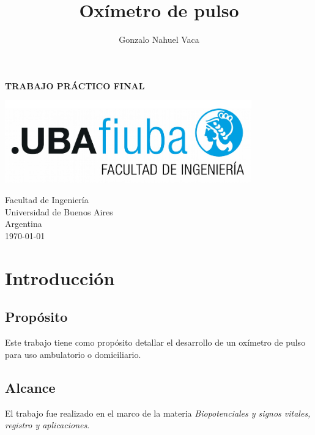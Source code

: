 \documentclass[
    11pt,
    spanish,
	a4paper
]{article}
\title{Oxímetro de pulso}
\author{Gonzalo Nahuel Vaca}
\def\doctype{TRABAJO PRÁCTICO FINAL}
\begin{document}
\makeatletter
\begin{titlepage}
	\begin{center}
		\vspace*{1cm}
		
		\Huge
		\textbf{\doctype}
		
		\vspace{0.5cm}
		\LARGE
		\@title
		
		\vspace{1.5cm}
		
		\textbf{\@author}

		\vspace{3.5cm}

		\includegraphics[width=0.8\textwidth]{img/logoFIUBA.pdf}
		
		\vfill
		Facultad de Ingeniería\\
		Universidad de Buenos Aires\\
		Argentina\\
		\today
	\end{center}
\end{titlepage}
\makeatother
\newpage

\section{Introducción}
\label{sec:introduccion}

\subsection{Propósito}
\label{subsec:proposito}

Este trabajo tiene como propósito detallar el desarrollo de un oxímetro de pulso para uso ambulatorio o domiciliario.

\subsection{Alcance}
\label{subsec:alcance}

El trabajo fue realizado en el marco de la materia \emph{Biopotenciales y signos vitales, registro y aplicaciones}.
\end{document}

